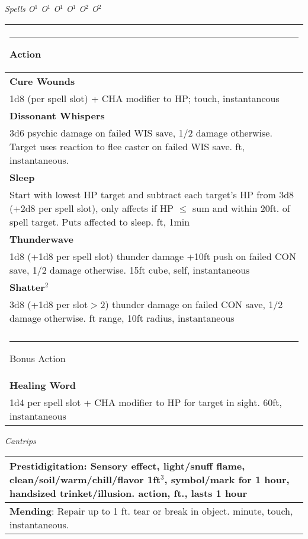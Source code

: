\documentclass[letterpaper,10pt,twoside,twocolumn,openany]{book}
\begin{document}
{\Large{\textit{Spells \hspace{5em}O$^1$ O$^1$ O$^1$ O$^1$ O$^2$ O$^2$}}}\\
\begin{tabular}{|m{3.1in}|}
\hline
\rule{1.25in}{0pt}Action\\
\hline
\textbf{Cure Wounds}\\
1d8 (per spell slot) + CHA modifier to HP; {\sc touch, instantaneous}\\
\textbf{Dissonant Whispers}\\
3d6 psychic damage on failed WIS save, 1/2 damage otherwise. Target uses reaction to flee caster on failed WIS save.  {\sc 60 ft, instantaneous}.\\
\textbf{Sleep}\\
Start with lowest HP target and subtract each target's HP from 3d8 (+2d8 per spell slot), only affects if HP $\leq$ sum and within 20ft. of spell target. Puts affected to sleep. {\sc 90 ft, 1min}\\
\textbf{Thunderwave}\\
1d8 (+1d8 per spell slot) thunder damage +10ft push on failed CON save, 1/2 damage otherwise. {\sc 15ft cube, self, instantaneous}\\
\textbf{Shatter$^2$}\\
3d8 (+1d8 per slot$>$2) thunder damage on failed CON save, 1/2 damage otherwise. {\sc 60 ft range, 10ft radius, instantaneous}\\
\hline\\
\rule{1.1in}{0pt}Bonus Action\\
\hline
\textbf{Healing Word}\\
1d4 per spell slot + CHA modifier to HP for target in sight. {\sc 60ft, instantaneous}\\
\hline
\end{tabular}
\vspace{8pt}

{\Large{\textit{Cantrips}}}\\
\begin{tabular}{|m{3.1in}|}
\hline
\textbf{Prestidigitation}: Sensory effect, light/snuff flame, clean/soil/warm/chill/flavor 1ft$^3$, symbol/mark for 1 hour, handsized trinket/illusion.  {\sc action, \sc 10 ft., lasts 1 hour}\\
\hline
\textbf{Mending}: Repair up to 1 ft. tear or break in object. {\sc 1 minute, touch, instantaneous.}\\
\hline
\end{tabular}
\vspace{8pt}
\end{document}
